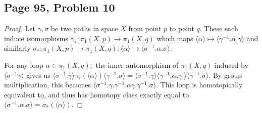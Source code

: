 \subsection*{Page 95, Problem 10}
\vspace{15pt}
\begin{proof}
    \vspace{-10pt}
    Let $\gamma, \sigma$ be two paths in space $X$ from point $p$ to point $q$. These each induce isomorphisms $\gamma_*\colon\pi_1(X,p)\to\pi_1(X,q)$ which maps $\langle\alpha\rangle\mapsto\langle\gamma^{-1}.\alpha.\gamma\rangle$ and similarly $\sigma_*\colon\pi_1(X,p)\to\pi_1(X,q)\colon\langle\alpha\rangle\mapsto\langle\sigma^{-1}.\alpha.\sigma\rangle.$

    For any loop $\alpha \in \pi_1(X,q),$ the inner automorphism of $\pi_1(X,q)$ induced by $\langle\sigma^{-1}\gamma\rangle$ gives us $\langle\sigma^{-1}.\gamma\rangle\gamma_*(\langle\alpha\rangle)\langle\gamma^{-1}.\sigma\rangle = \langle\sigma^{-1}.\gamma\rangle\langle\gamma^{-1}.\alpha.\gamma.\rangle\langle\gamma^{-1}.\sigma\rangle.$ By group multiplication, this becomes $\langle\sigma^{-1}.\gamma.\gamma^{-1}.\alpha\gamma.\gamma^{-1}.\sigma\rangle.$ This loop is homotopically equivalent to, and thus has homotopy class exactly equal to $\langle\sigma^{-1}.\alpha.\sigma\rangle = \sigma_*(\langle\alpha\rangle).$
\end{proof}

